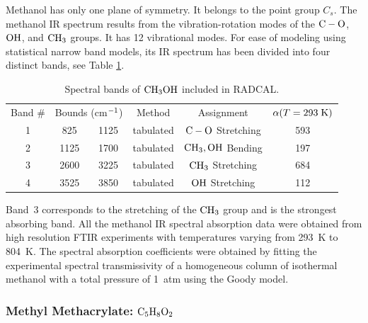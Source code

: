 Methanol has only one plane of symmetry. It belongs to the point group $C_{s}$. The methanol IR spectrum results from the vibration-rotation modes of the $\rm C-O$, $\rm OH$, and $\rm CH_3$ groups. It has 12 vibrational modes. For ease of modeling using statistical narrow band models, its IR spectrum has been divided into four distinct bands, see Table \ref{Table::CH3OH}.
\begin{table}[ht]
   \centering
   \caption{Spectral bands of $\rm CH_3OH$ included in RADCAL.}
   \vspace{0.1in}
   \label{Table::CH3OH}
   \begin{tabular}{|c|c|c|c|c|c|}
    \hline
    Band \# & \multicolumn{2}{|l|}{Bounds (cm$\rm ^{-1}$) } & Method & Assignment &  $\alpha(T=293 \; {\rm K})$ \\
    \cline{1-6}
    1 & 825  & 1125 & tabulated & $\rm C-O$ Stretching   & 593 \\
    2 & 1125 & 1700 & tabulated & $\rm CH_3, OH$ Bending & 197 \\
    3 & 2600 & 3225 & tabulated & $\rm CH_3$ Stretching  & 684 \\
    4 & 3525 & 3850 & tabulated & $\rm OH$ Stretching    & 112 \\
    \hline
   \end{tabular}
\end{table}
Band~3 corresponds to the stretching of the $\rm CH_3$ group and is the strongest absorbing band. All the methanol IR spectral absorption data were obtained from high resolution FTIR experiments with temperatures varying from 293~K to 804~K. The spectral absorption coefficients were obtained by fitting the experimental spectral transmissivity of a homogeneous column of isothermal methanol with a total pressure of 1~atm using the Goody model.

\subsubsection{Methyl Methacrylate: $\rm C_5H_8O_2$}

